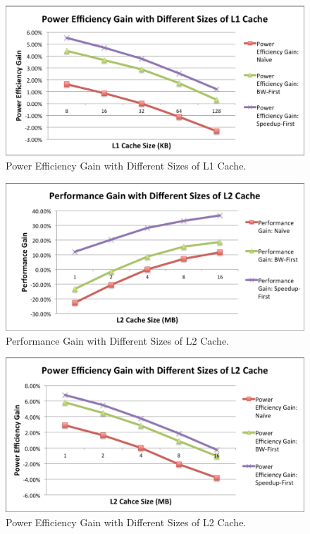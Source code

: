 \begin{figure}
    \centering
    \includegraphics[width=4.5in]{L1-Cache-Power}
    \caption{Power Efficiency Gain with Different Sizes of L1 Cache.}
    \label{fig_l1_power}
\end{figure}

\begin{figure}
    \centering
    \includegraphics[width=4.5in]{L2-Cache-Performance}
    \caption{Performance Gain with Different Sizes of L2 Cache.}
    \label{fig_l2_perf}
\end{figure}

\begin{figure}
    \centering
    \includegraphics[width=4.5in]{L2-Cache-Power}
    \caption{Power Efficiency Gain with Different Sizes of L2 Cache.}
    \label{fig_l2_power}
\end{figure}

